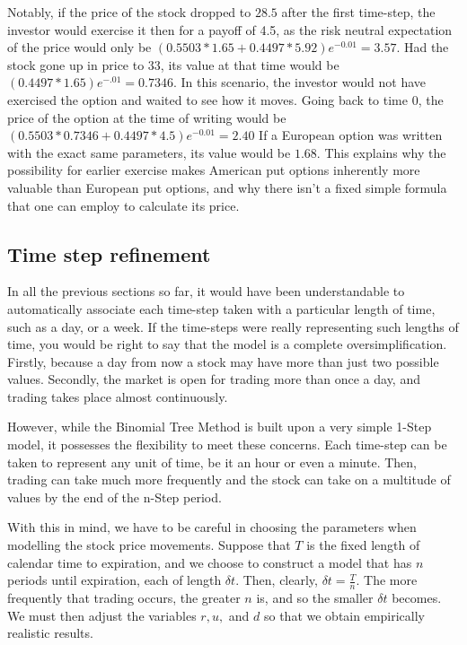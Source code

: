 \documentclass[letterpaper,12pt]{article}
\theoremstyle{plain}
\numberwithin{equation}{section}
\begin{document}
Notably, if the price of the stock dropped to $28.5$ after the first time-step, the investor would exercise it then for a payoff of 4.5, as the risk neutral expectation of the price would only be $(0.5503*1.65 + 0.4497*5.92)e^{-0.01} = 3.57$. Had the stock gone up in price to $33$, its value at that time would be $(0.4497*1.65)e^{-.01} = 0.7346$. In this scenario, the investor would not have exercised the option and waited to see how it moves. Going back to time $0$, the price of the option at the time of writing would be $(0.5503*0.7346 + 0.4497*4.5)e^{-0.01} = 2.40$
If a European option was written with the exact same parameters, its value would be $1.68$. This explains why the possibility for earlier exercise makes American put options inherently more valuable than European put options, and why there isn't a fixed simple formula that one can employ to calculate its price.

\subsection{Time step refinement}
In all the previous sections so far, it would have been understandable to automatically associate each time-step taken with a particular length of time, such as a day, or a week. If the time-steps were really representing such lengths of time, you would be right to say that the model is a complete oversimplification. Firstly, because a day from now a stock may have more than just two possible values. Secondly, the market is open for trading more than once a day, and trading takes place almost continuously.

However, while the Binomial Tree Method is built upon a very simple 1-Step model, it possesses the flexibility to meet these concerns. Each time-step can be taken to represent any unit of time, be it an hour or even a minute. Then, trading can take much more frequently and the stock can take on a multitude of values by the end of the n-Step period.

With this in mind, we have to be careful in choosing the parameters when modelling the stock price movements. Suppose that $T$ is the fixed length of calendar time to expiration, and we choose to construct a model that has $n$ periods until expiration, each of length $\delta t$. Then, clearly, $\delta t = \frac{T}{n} $. The more frequently that trading occurs, the greater $n$ is, and so the smaller $\delta t$ becomes. We must then adjust the variables $r, u,$ and $d$ so that we obtain empirically realistic results.
\end{document}
